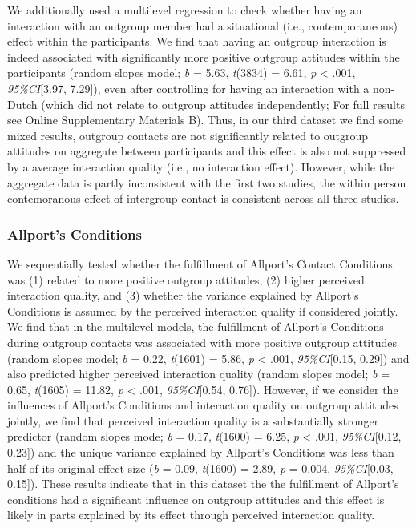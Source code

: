 We additionally used a multilevel regression to check whether having an
interaction with an outgroup member had a situational (i.e.,
contemporaneous) effect within the participants. We find that having an
outgroup interaction is indeed associated with significantly more
positive outgroup attitudes within the participants (random slopes
model; \textit{b} = 5.63, \textit{t}(3834) = 6.61, \textit{p}
\textless{} .001, \textit{95\%CI}{[}3.97, 7.29{]}), even after
controlling for having an interaction with a non-Dutch (which did not
relate to outgroup attitudes independently; For full results see Online
Supplementary Materials B). Thus, in our third dataset we find some
mixed results, outgroup contacts are not significantly related to
outgroup attitudes on aggregate between participants and this effect is
also not suppressed by a average interaction quality (i.e., no
interaction effect). However, while the aggregate data is partly
inconsistent with the first two studies, the within person contemoranous
effect of intergroup contact is consistent across all three studies.

\subsubsection{Allport's Conditions}

We sequentially tested whether the fulfillment of Allport's Contact
Conditions was (1) related to more positive outgroup attitudes, (2)
higher perceived interaction quality, and (3) whether the variance
explained by Allport's Conditions is assumed by the perceived
interaction quality if considered jointly. We find that in the
multilevel models, the fulfillment of Allport's Conditions during
outgroup contacts was associated with more positive outgroup attitudes
(random slopes model; \textit{b} = 0.22, \textit{t}(1601) = 5.86,
\textit{p} \textless{} .001, \textit{95\%CI}{[}0.15, 0.29{]}) and also
predicted higher perceived interaction quality (random slopes model;
\textit{b} = 0.65, \textit{t}(1605) = 11.82, \textit{p} \textless{}
.001, \textit{95\%CI}{[}0.54, 0.76{]}). However, if we consider the
influences of Allport's Conditions and interaction quality on outgroup
attitudes jointly, we find that perceived interaction quality is a
substantially stronger predictor (random slopes mode; \textit{b} = 0.17,
\textit{t}(1600) = 6.25, \textit{p} \textless{} .001,
\textit{95\%CI}{[}0.12, 0.23{]}) and the unique variance explained by
Allport's Conditions was less than half of its original effect size
(\textit{b} = 0.09, \textit{t}(1600) = 2.89, \textit{p} = 0.004,
\textit{95\%CI}{[}0.03, 0.15{]}). These results indicate that in this
dataset the the fulfillment of Allport's conditions had a significant
influence on outgroup attitudes and this effect is likely in parts
explained by its effect through perceived interaction quality.

